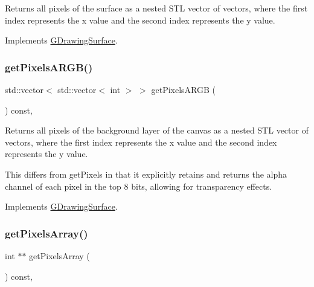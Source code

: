 Returns all pixels of the surface as a nested S\+TL vector of vectors, where the first index represents the x value and the second index represents the y value. 



Implements \mbox{\hyperlink{classsgl_1_1GDrawingSurface_aaaa615cb8868420f5451082c843f8b73}{G\+Drawing\+Surface}}.

\mbox{\label{classsgl_1_1GCanvas_a07228643bf746aad52b1976626bc1a10}} 
\subsubsection{\texorpdfstring{get\+Pixels\+A\+R\+G\+B()}{getPixelsARGB()}}
{\footnotesize\ttfamily std\+::vector$<$ std\+::vector$<$ int $>$ $>$ get\+Pixels\+A\+R\+GB (\begin{DoxyParamCaption}{ }\end{DoxyParamCaption}) const\hspace{0.3cm}{\ttfamily [override]}, {\ttfamily [virtual]}}



Returns all pixels of the background layer of the canvas as a nested S\+TL vector of vectors, where the first index represents the x value and the second index represents the y value. 

This differs from get\+Pixels in that it explicitly retains and returns the alpha channel of each pixel in the top 8 bits, allowing for transparency effects. 

Implements \mbox{\hyperlink{classsgl_1_1GDrawingSurface_ad3338953d25c3863e554fa40f0529994}{G\+Drawing\+Surface}}.

\mbox{\label{classsgl_1_1GCanvas_a92e494e15293328503821bbe388d7933}} 
\subsubsection{\texorpdfstring{get\+Pixels\+Array()}{getPixelsArray()}}
{\footnotesize\ttfamily int $\ast$$\ast$ get\+Pixels\+Array (\begin{DoxyParamCaption}{ }\end{DoxyParamCaption}) const\hspace{0.3cm}{\ttfamily [override]}, {\ttfamily [virtual]}}



